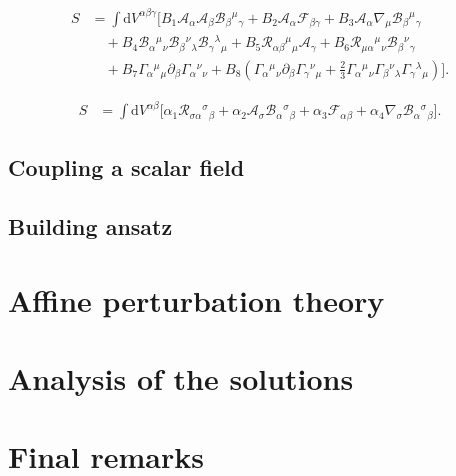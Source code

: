 \documentclass{article}
\begin{document}
\begin{equation}
    \label{PAG_3D_action}
    \begin{split}
    S
    & =
    \int  \mathrm{d}V^{\alpha \beta \gamma } \bigg[
    B_1\mathcal{A}_\alpha\mathcal{A}_\beta\mathcal{B}_{\beta}{}^{\mu}{}_{\gamma} 
    + B_2\mathcal{A}_\alpha\mathcal{F}_{\beta\gamma} 
    + B_3\mathcal{A}_\alpha \nabla_\mu \mathcal{B}_{\beta}{}^{\mu}{}_{\gamma} 
    \\
    & \quad
    + B_4\mathcal{B}_{\alpha}{}^{\mu}{}_{\nu}\mathcal{B}_{\beta}{}^{\nu}{}_{\lambda}\mathcal{B}_{\gamma}{}^{\lambda}{}_{\mu} 
    + B_5\mathcal{R}_{\alpha\beta}{}^{\mu}{}_{\mu}\mathcal{A}_{\gamma} 
    + B_6\mathcal{R}_{\mu\alpha}{}^{\mu}{}_{\nu}\mathcal{B}_{\beta}{}^{\nu}{}_{\gamma}
    \\
    & \quad
    + B_7\Gamma_{\alpha}{}^{\mu}{}_{\mu}\partial_\beta \Gamma_{\alpha}{}^{\nu}{}_{\nu}
    + B_8\left(\Gamma_{\alpha}{}^{\mu}{}_{\nu}\partial_\beta \Gamma_{\gamma}{}^{\nu}{}_{\mu} + \frac{2}{3}\Gamma_{\alpha}{}^{\mu}{}_{\nu}\Gamma_{\beta}{}^{\nu}{}_{\lambda}\Gamma_{\gamma}{}^{\lambda}{}_{\mu}\right) \bigg].
    \end{split}
\end{equation}

\begin{equation}
    \label{PAG_2D_action}
    \begin{split}
    S
    & =
    \int  \mathrm{d}V^{\alpha \beta} \bigg[
    \alpha_1\mathcal{R}_{\sigma\alpha}{}^{\sigma}{}_{\beta} 
    + \alpha_2\mathcal{A}_\sigma\mathcal{B}_{\alpha}{}^{\sigma}{}_{\beta} 
    + \alpha_3\mathcal{F}_{\alpha\beta} 
    + \alpha_4\nabla_{\sigma}\mathcal{B}_{\alpha}{}^{\sigma}{}_{\beta}\bigg].
    \end{split}
\end{equation}

\subsection{Coupling a scalar field}
\label{subsec:coupling a scalar field}

\subsection{Building ansatz}
\label{subsec:building ansatz}

\section{Affine perturbation theory}
\label{sec:affine perturbations}

\section{Analysis of the solutions}
\label{subsec:solutions}

\section{Final remarks}
\label{sec:final remarks}





\end{document}

